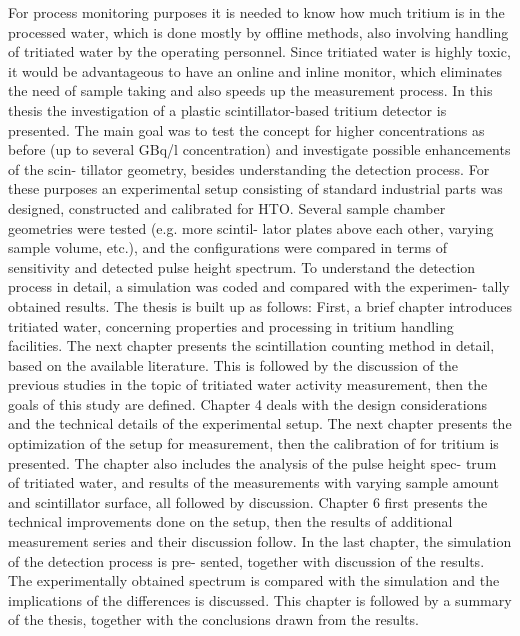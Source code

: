 For process monitoring purposes it is needed to know how much tritium is in
the processed water, which is done mostly by offline methods, also involving handling
of tritiated water by the operating personnel. Since tritiated water is highly toxic, it
would be advantageous to have an online and inline monitor, which eliminates the need
of sample taking and also speeds up the measurement process.
In this thesis the investigation of a plastic scintillator-based tritium detector is
presented. The main goal was to test the concept for higher concentrations as before
(up to several GBq/l concentration) and investigate possible enhancements of the scin-
tillator geometry, besides understanding the detection process. For these purposes an
experimental setup consisting of standard industrial parts was designed, constructed and
calibrated for HTO. Several sample chamber geometries were tested (e.g. more scintil-
lator plates above each other, varying sample volume, etc.), and the configurations were
compared in terms of sensitivity and detected pulse height spectrum. To understand the
detection process in detail, a simulation was coded and compared with the experimen-
tally obtained results.
The thesis is built up as follows: First, a brief chapter introduces tritiated water,
concerning properties and processing in tritium handling facilities. The next chapter
presents the scintillation counting method in detail, based on the available literature.
This is followed by the discussion of the previous studies in the topic of tritiated water
activity measurement, then the goals of this study are defined. Chapter 4 deals with
the design considerations and the technical details of the experimental setup. The next
chapter presents the optimization of the setup for measurement, then the calibration of
for tritium is presented. The chapter also includes the analysis of the pulse height spec-
trum of tritiated water, and results of the measurements with varying sample amount
and scintillator surface, all followed by discussion. Chapter 6 first presents the technical
improvements done on the setup, then the results of additional measurement series and
their discussion follow. In the last chapter, the simulation of the detection process is pre-
sented, together with discussion of the results. The experimentally obtained spectrum is
compared with the simulation and the implications of the differences is discussed. This
chapter is followed by a summary of the thesis, together with the conclusions drawn
from the results.